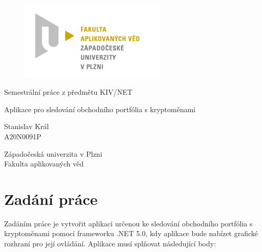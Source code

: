 \documentclass[12pt, a4paper]{article}
\let\oldsection\section
\renewcommand\section{\clearpage\oldsection}
\begin{document}
	\renewcommand{\lstlistingname}{Ukázka kódu}
	\renewcommand{\lstlistlistingname}{Seznam ukázek kódu}
    \begin{titlepage}

        \centering

        \vspace*{\baselineskip}
        \begin{figure}[H]
        \centering
        \includegraphics[width=7cm]{img/fav-logo.jpg}
        \end{figure}

        \vspace*{1\baselineskip}

        \vspace{0.75\baselineskip}

        \vspace{0.5\baselineskip}
        {Semestrální práce z předmětu KIV/NET}

        {\LARGE\sc Aplikace pro sledování obchodního portfólia s kryptoměnami \\}

        \vspace{4\baselineskip}

        \vspace{0.5\baselineskip}

        {\sc\Large Stanislav Král \\}
        \vspace{0.5\baselineskip}
        {A20N0091P}

        \vfill

        {\sc Západočeská univerzita v Plzni\\
        Fakulta aplikovaných věd}

    \end{titlepage}


    \tableofcontents
    \pagebreak

\section{Zadání práce}
Zadáním práce je vytvořit aplikaci určenou ke sledování obchodního portfólia s kryptoměnami pomocí frameworku .NET 5.0, kdy aplikace bude nabízet grafické rozhraní pro její ovládání. Aplikace musí splňovat následující body:
\end{document}
